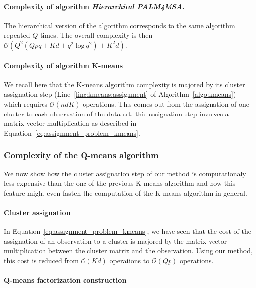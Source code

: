 \paragraph{Complexity of algorithm \textit{Hierarchical PALM4MSA}.}

The hierarchical version of the algorithm corresponds to the same algorithm repeated $Q$ times. The overall complexity is then $\mathcal{O}(Q^2(Qpq + Kd + q^2\log q^2) + K^2d)$. 

\paragraph{Complexity of algorithm K-means}
We recall here that the K-means algorithm complexity is majored by its cluster assignation step (Line~\ref{line:kmeans:assignment} of Algorithm~\ref{algo:kmeans}) which requires $\mathcal{O}(ndK)$ operations. This comes out from the assignation of one cluster to each observation of the data set. this assignation step involves a matrix-vector multiplication as described in Equation~\ref{eq:assignment_problem_kmeans}.

\subsubsection{Complexity of the Q-means algorithm}

We now show how the cluster assignation step of our method is computationaly less expensive than the one of the previous K-means algorithm and how this feature might even fasten the computation of the K-means algorithm in general.

\paragraph{Cluster assignation}

In Equation~\ref{eq:assignment_problem_kmeans}, we have seen that the cost of the assignation of an observation to a cluster is majored by the matrix-vector multiplication between the cluster matrix and the observation. Using our method, this cost is reduced from $\mathcal{O}(Kd)$ operations to $\mathcal{O}(Qp)$ operations. 

\paragraph{Q-means factorization construction}

